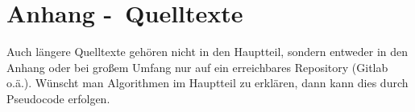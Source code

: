 
\clearpage
\chapter{Anhang -\ Quelltexte}
Auch längere Quelltexte gehören nicht in den Hauptteil,
sondern entweder in den Anhang oder bei großem Umfang nur auf
ein erreichbares Repository (Gitlab o.ä.).
Wünscht man Algorithmen im Hauptteil zu erklären, dann kann dies durch Pseudocode erfolgen.
